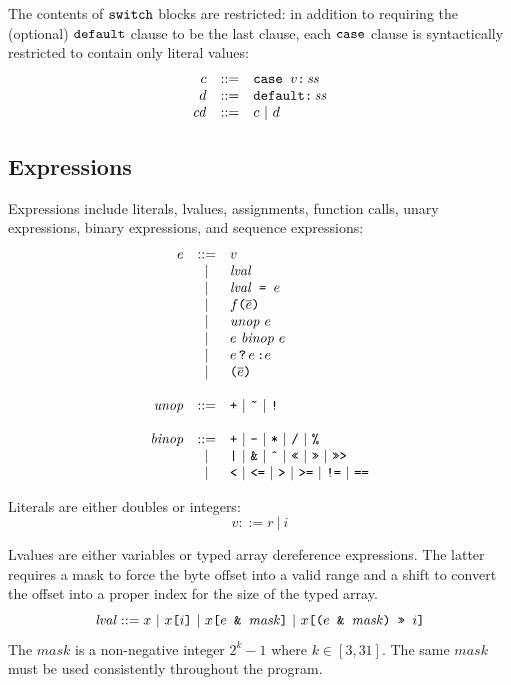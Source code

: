 \documentclass{article}
\newcommand{\funcall}[2]{{#1}\mathjs{(}{#2}\mathjs{)}}
\newcommand{\paren}[1]{\mathjs{(}{#1}\mathjs{)}}
\newcommand{\seq}[1]{\overline{{#1}}}
\newcommand{\mathjs}[1]{\mbox{\texttt{{#1}}}}
\newcommand{\ternary}[3]{{#1}\,\mathjs{?}\,{#2}\,\mathjs{:}{#3}}
\newcommand{\getprop}[2]{{#1}\mathjs{[}{#2}\mathjs{]}}
\begin{document}
The contents of $\mathjs{switch}$ blocks are restricted: in addition
to requiring the (optional) $\mathjs{default}$ clause to be the last
clause, each $\mathjs{case}$ clause is syntactically restricted to
contain only literal values:
\[
\begin{array}{rcl}
c & ::= & \mathjs{case }v\mathjs{:}\,\mathit{ss} \\
d & ::= & \mathjs{default:}\,\mathit{ss} \\
\mathit{cd} & ::= & c ~|~ d \\
\end{array}
\]

\subsection{Expressions}

Expressions include literals, lvalues, assignments, function calls,
unary expressions, binary expressions, and sequence expressions:
\[
\begin{array}{rcl}
e & ::= & v \\
  &  |  & \mathit{lval} \\
  &  |  & \mathit{lval}\mathjs{ = }e \\
  &  |  & \funcall{f}{\seq{e}} \\
  &  |  & \mathit{unop}\ e \\
  &  |  & e\ \mathit{binop}\ e \\
  &  |  & \ternary{e}{e}{e} \\
  &  |  & \paren{\seq{e}} \\
\\
\mathit{unop} & ::= & \mathjs{+} ~|~ \mathjs{\~{}} ~|~ \mathjs{!} \\
\\
\mathit{binop} & ::= & \mathjs{+} ~|~ \mathjs{-} ~|~ \mathjs{*} ~|~ \mathjs{/} ~|~ \mathjs{\%} \\
               &  |  & \mathjs{|} ~|~ \mathjs{\&} ~|~ \mathjs{\^{}} ~|~ \mathjs{<<} ~|~ \mathjs{>>} ~|~ \mathjs{>>>} \\
               &  |  & \mathjs{<} ~|~ \mathjs{<=} ~|~ \mathjs{>} ~|~ \mathjs{>=} ~|~ \mathjs{!=} ~|~ \mathjs{==} \\
\end{array}
\]

Literals are either doubles or integers:
\[
v ::= r ~|~ i
\]

Lvalues are either variables or typed array dereference
expressions. The latter requires a mask to force the byte offset into
a valid range and a shift to convert the offset into a proper index
for the size of the typed array.
\[
\mathit{lval} ::= x ~|~ \getprop{x}{i} ~|~ \getprop{x}{e\mathjs{ \& }\mathit{mask}} ~|~ \getprop{x}{\paren{e\mathjs{ \& }\mathit{mask}}\mathjs{ >> }i}
\]
The $\mathit{mask}$ is a non-negative integer $2^k - 1$ where $k \in
[3, 31]$.  The same $\mathit{mask}$ must be used consistently
throughout the program.
\end{document}
